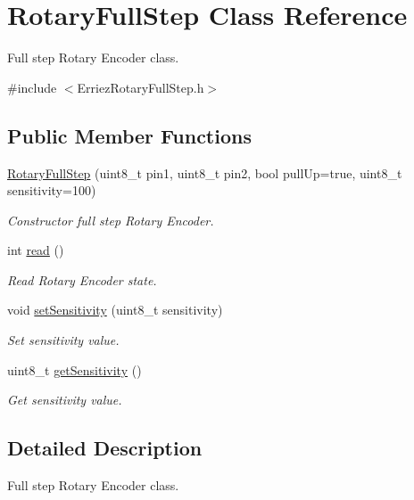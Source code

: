 \hypertarget{class_rotary_full_step}{}\section{Rotary\+Full\+Step Class Reference}
\label{class_rotary_full_step}


Full step Rotary Encoder class.  




{\ttfamily \#include $<$Erriez\+Rotary\+Full\+Step.\+h$>$}

\subsection*{Public Member Functions}
\begin{DoxyCompactItemize}
\item 
\hyperlink{class_rotary_full_step_aaf74de6f9ce49620a10b507e83591956}{Rotary\+Full\+Step} (uint8\+\_\+t pin1, uint8\+\_\+t pin2, bool pull\+Up=true, uint8\+\_\+t sensitivity=100)
\begin{DoxyCompactList}\small\item\em Constructor full step Rotary Encoder. \end{DoxyCompactList}\item 
int \hyperlink{class_rotary_full_step_a8abd339f6bba83afde753e450f1ba6c7}{read} ()
\begin{DoxyCompactList}\small\item\em Read Rotary Encoder state. \end{DoxyCompactList}\item 
void \hyperlink{class_rotary_full_step_a413a674f1244573ad90befc73fd6e1d4}{set\+Sensitivity} (uint8\+\_\+t sensitivity)
\begin{DoxyCompactList}\small\item\em Set sensitivity value. \end{DoxyCompactList}\item 
uint8\+\_\+t \hyperlink{class_rotary_full_step_a55a1fce8a0b6436767f204ce16bc86fd}{get\+Sensitivity} ()
\begin{DoxyCompactList}\small\item\em Get sensitivity value. \end{DoxyCompactList}\end{DoxyCompactItemize}


\subsection{Detailed Description}
Full step Rotary Encoder class. 

